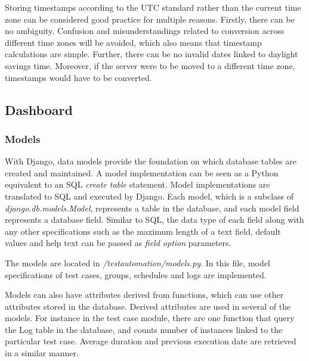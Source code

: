 Storing timestamps according to the UTC standard rather than the current time zone can be considered good practice for multiple reasons. Firstly, there can be no ambiguity. Confusion and misunderstandings related to conversion across different time zones will be avoided, which also means that timestamp calculations are simple. Further, there can be no invalid dates linked to daylight savings time. Moreover, if the server were to be moved to a different time zone, timestamps would have to be converted.





\subsection{Dashboard}


\subsubsection{Models}

With Django, data models provide the foundation on which database tables are created and maintained. A model implementation can be seen as a Python equivalent to an SQL \emph{create table} statement. Model implementations are translated to SQL and executed by Django. Each model, which is a subclass of \emph{django.db.models.Model}, represents a table in the database, and each model field represents a database field. Similar to SQL, the data type of each field along with any other specifications such as the maximum length of a text field, default values and help text can be passed as \emph{field option} parameters.

The models are located in \emph{/testautomation/models.py}. In this file, model specifications of test cases, groups, schedules and logs are implemented.

Models can also have attributes derived from functions, which can use other attributes stored in the database. Derived attributes are used in several of the models. For instance in the test case module, there are one function that query the Log table in the database, and counts number of instances linked to the particular test case. Average duration and previous execution date are retrieved in a similar manner.

